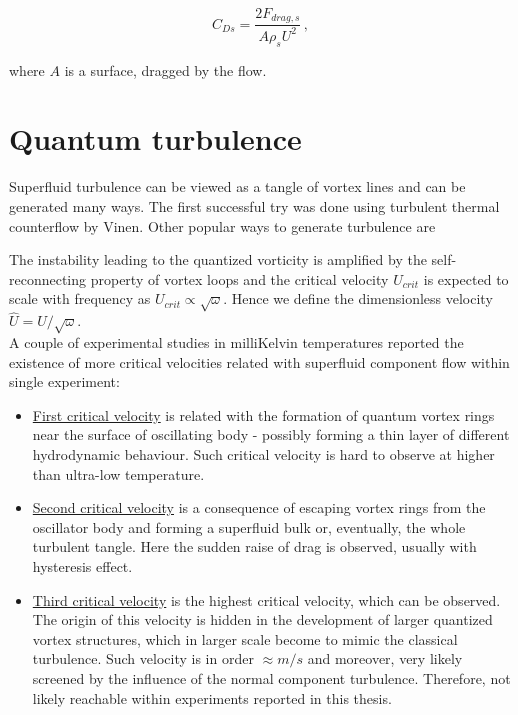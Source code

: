 \begin{equation}
C_{Ds} = \frac{2F_{drag,s}}{A\rho_s U^2}\,,
\end{equation}

where $A$ is a surface, dragged by the flow.

\section{Quantum turbulence}

Superfluid turbulence can be viewed as a tangle of vortex lines and can be generated many ways. The first successful try was done using turbulent thermal counterflow by Vinen. Other popular ways to generate turbulence are

The instability leading to the quantized vorticity is amplified by the self-reconnecting property of vortex loops and the critical velocity $U_{crit}$ is expected to scale with frequency as $U_{crit} \propto \sqrt{\omega}$. Hence we define the dimensionless velocity $\hat{U} = U / \sqrt{\omega}$.\\
A couple of experimental studies in milliKelvin temperatures reported the existence of more critical velocities related with superfluid component flow within single experiment:

\begin{itemize}
	\item \underline{First critical velocity} is related with the formation of quantum vortex rings near the surface of oscillating body - possibly forming a thin layer of different hydrodynamic behaviour. Such critical velocity is hard to observe at higher than ultra-low temperature.

	\item \underline{Second critical velocity} is a consequence of escaping vortex rings from the oscillator body and forming a superfluid bulk or, eventually, the whole turbulent tangle. Here the sudden raise of drag is observed, usually with hysteresis effect.

	\item \underline{Third critical velocity} is the highest critical velocity, which can be observed. The origin of this velocity is hidden in the development of larger quantized vortex structures, which in larger scale become to mimic the classical turbulence. Such velocity is in order $\approx \unit{m/s}$ and moreover, very likely screened by the influence of the normal component turbulence. Therefore, not likely reachable within experiments reported in this thesis.
\end{itemize}

